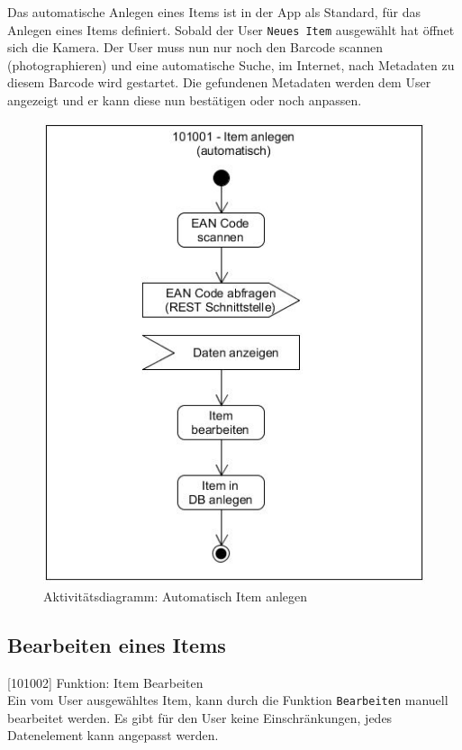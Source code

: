 Das automatische Anlegen eines Items ist in der App als Standard, für das Anlegen eines Items definiert. Sobald der User {\color{IndianRed}\texttt{Neues Item}} ausgewählt hat öffnet sich die Kamera. Der User muss nun nur noch den Barcode scannen (photographieren) und eine automatische Suche, im Internet, nach Metadaten zu diesem Barcode wird gestartet. Die gefundenen Metadaten werden dem User angezeigt und er kann diese nun bestätigen oder noch anpassen.

\begin{figure}[htbp]
	\centering
	\includegraphics[scale=0.6]{pic/101001a}
	\caption{Aktivitätsdiagramm: Automatisch Item anlegen}
\end{figure}

\subsection{Bearbeiten eines Items}

[101002] Funktion: Item Bearbeiten\\

Ein vom User ausgewähltes Item, kann durch die Funktion {\color{IndianRed}\texttt{Bearbeiten}} manuell bearbeitet werden. Es gibt für den User keine Einschränkungen, jedes Datenelement kann angepasst werden.

